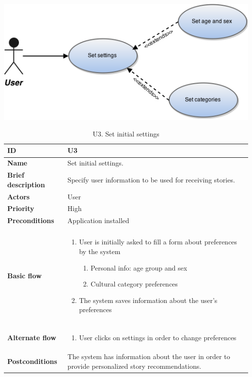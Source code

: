 \begin{table}[htp]
	\includegraphics[width=\textwidth]{fig/U3}
	\centering
	\caption{U3. Set initial settings}
	\begin{tabular}[b]{|l | p{13cm}|}\hline
		\textbf{ID} 				& U3									\\\hline
		\textbf{Name} 				& Set initial settings.					\\\hline
		\textbf{Brief description}	& Specify user information to be used for receiving stories. \\\hline
		\textbf{Actors} 			& User									\\\hline
		\textbf{Priority}			& High									\\\hline
		\textbf{Preconditions}		& Application installed					\\\hline&\\[-2ex]
		\textbf{Basic flow}			& \begin{minipage}{5in}
			\begin{enumerate}[noitemsep]
				\item User is initially asked to fill a form about preferences by the system
					\begin{enumerate}
						\item Personal info: age group and sex
						\item Cultural category preferences
					\end{enumerate}
				\item The system saves information about the user’s preferences
			\end{enumerate}						
		\end{minipage}						\\\hline&\\[-2ex]
		\textbf{Alternate flow}		& \begin{minipage}{5in}
			\begin{enumerate}[noitemsep]
				\item User clicks on settings in order to change preferences
			\end{enumerate}
		\end{minipage}							\\\hline
		\textbf{Postconditions}		& The system has information about the user in order to provide personalized story recommendations.\\\hline
	\end{tabular}
\end{table}

